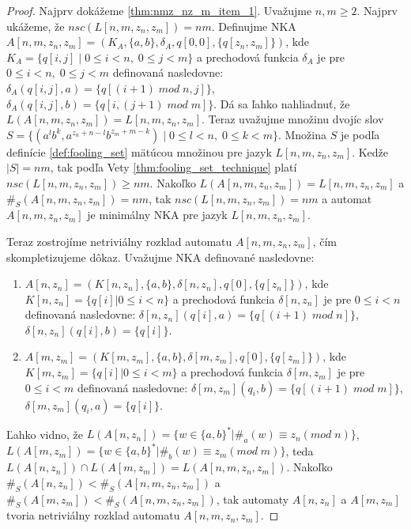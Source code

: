 \begin{proof}
Najprv dokážeme \ref{thm:nmz_nz_m_item_1}. Uvažujme $ n,m \geq 2 $. Najprv ukážeme, že $ nsc(L[n,m,z_n,z_m])=nm $. Definujme NKA $ A[n,m,z_n,z_m]=(K_A,\lbrace a,b \rbrace,\delta_A,q[0,0],\lbrace q[z_n,z_m] \rbrace) $, kde $ K_A = \lbrace q[i,j] \; | \; 0 \leq i < n, \; 0 \leq j < m \rbrace $ a prechodová funkcia $ \delta_A $ je pre $ 0 \leq i < n, \; 0 \leq j < m $ definovaná nasledovne: $ \delta_A(q[i,j],a) = \lbrace q[(i+1) \; mod \; n,j] \rbrace $, $ \delta_A(q[i,j],b) = \lbrace q[i, (j+1) \; mod \; m] \rbrace $. Dá sa ľahko nahliadnuť, že $ L(A[n,m,z_n,z_m])=L[n,m,z_n,z_m] $. Teraz uvažujme množinu dvojíc slov $ S = \lbrace (a^lb^k, a^{z_n+n-l}b^{z_m+m-k}) \; | \; 0 \leq l < n, \; 0 \leq k < m \rbrace $. Množina $ S $ je podľa definície \ref{def:fooling_set} mätúcou množinou pre jazyk $ L[n,m,z_n,z_m] $. Kedže $ |S|=nm $, tak podľa Vety \ref{thm:fooling_set_technique} platí $ nsc(L[n,m,z_n,z_m]) \geq nm $. Nakoľko $ L(A[n,m,z_n,z_m])=L[n,m,z_n,z_m] $ a $ \#_S(A[n,m,z_n,z_m])=nm $, tak $ nsc(L[n,m,z_n,z_m])=nm $ a automat $ A[n,m,z_n,z_m] $ je minimálny NKA pre jazyk $ L[n,m,z_n,z_m] $.
\par
Teraz zostrojíme netriviálny rozklad automatu $ A[n,m,z_n,z_m] $, čím skompletizujeme dôkaz. Uvažujme NKA definované nasledovne:
\begin{enumerate}  
\item $ A[n,z_n] = (K[n,z_n],\lbrace a,b \rbrace,\delta[n,z_n],q[0],\lbrace q[z_n] \rbrace)$, kde $ K[n,z_n] = \lbrace q[i] | 0 \leq i < n\rbrace $ a prechodová funkcia $ \delta[n,z_n] $ je pre $ 0 \leq i < n $ definovaná nasledovne: $ \delta[n,z_n](q[i],a) = \lbrace q[(i+1) \; mod \; n] \rbrace $, $ \delta[n,z_n](q[i],b) = \lbrace q[i] \rbrace $.
\item $ A[m,z_m] = (K[m,z_m],\lbrace a,b \rbrace,\delta[m,z_m],q[0],\lbrace q[z_m] \rbrace)$, kde $ K[m,z_m] = \lbrace q[i] | 0 \leq i < m \rbrace $ a prechodová funkcia $ \delta[m,z_m] $ je pre $ 0 \leq i < m $ definovaná nasledovne: $ \delta[m,z_m](q_i,b) = \lbrace q[(i+1) \; mod \; m] \rbrace $, $ \delta[m,z_m](q_i,a) = \lbrace q[i] \rbrace $.
\end{enumerate}
Ľahko vidno, že $ L(A[n,z_n]) = \lbrace w \in \lbrace a,b \rbrace^{*} | \#_a(w) \equiv z_n (mod \; n) \rbrace$, $ L(A[m,z_m]) = \lbrace w \in \lbrace a,b \rbrace^{*} | \#_b(w) \equiv z_m (mod \; m) \rbrace $, teda $ L(A[n,z_n]) \cap L(A[m,z_m]) = L(A[n,m,z_n,z_m]) $. Nakoľko $ \#_S(A[n,z_n]) < \#_S(A[n,m,z_n,z_m]) $ a $ \#_S(A[m,z_m]) < \#_S(A[n,m,z_n,z_m]) $, tak automaty $ A[n,z_n] $ a $ A[m,z_m] $ tvoria netriviálny rozklad automatu $ A[n,m,z_n,z_m] $.

\end{proof}
